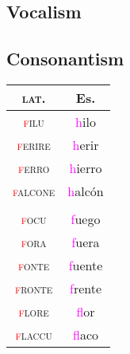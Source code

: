 \documentclass{report}
\begin{document}
\subsection{Vocalism}

\subsection{Consonantism}

\begin{tcolorbox}[title=Debuccalization of /f/]
  
\end{tcolorbox}

\begin{tabular}{c c}
  \textsc{lat.} & Es. \\
  \hline
  \textsc{\textcolor{red}{f}ilu} & \textcolor{magenta}{h}ilo \\
  \textsc{\textcolor{red}{f}erire} & \textcolor{magenta}{h}erir \\
  \textsc{\textcolor{red}{f}erro} & \textcolor{magenta}{h}ierro \\
  \textsc{\textcolor{red}{f}alcone} & \textcolor{magenta}{h}alcón \\
                & \\
  \textsc{\textcolor{red}{f}ocu} & \textcolor{magenta}{f}uego \\
  \textsc{\textcolor{red}{f}ora} & \textcolor{magenta}{f}uera \\
  \textsc{\textcolor{red}{f}onte} & \textcolor{magenta}{f}uente \\
  \textsc{\textcolor{red}{f}ronte} & \textcolor{magenta}{f}rente \\
  \textsc{\textcolor{red}{f}lore} & \textcolor{magenta}{f}lor \\
  \textsc{\textcolor{red}{f}laccu} & \textcolor{magenta}{f}laco \\
\end{tabular}

\begin{tcolorbox}[title=Betacism II]

\end{tcolorbox}


\end{document}
